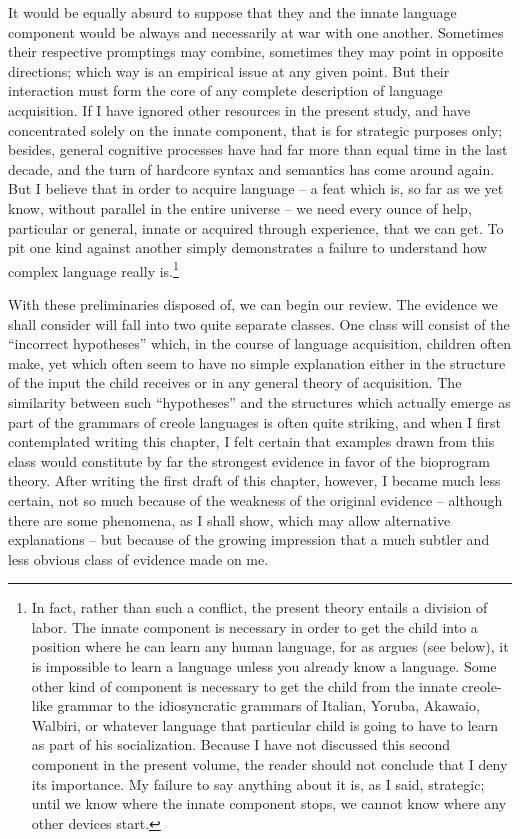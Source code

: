 It would be equally absurd to suppose that they and the innate language component would be always and necessarily at war with one another. Sometimes their respective promptings may combine, sometimes they may point in opposite directions; which way is an empirical issue at any given point. But their interaction must form the core of any complete description of language acquisition. If I have ignored other resources in the present study, and have concentrated solely on the innate component, that is for strategic purposes only; besides, general cognitive processes have had far more than equal time in the last decade, and the turn of hardcore syntax and semantics has come around again. But I believe that in order to acquire language -- a feat which is, so far as we yet know, without parallel in the entire universe -- we need every ounce of help, particular or general, innate or acquired through experience, that we can get. To pit one kind against another simply demonstrates a failure to understand how complex language really is.\footnote{In fact, rather than such a conflict, the present theory entails a division of labor. The innate component is necessary in order to get the child into a position where he can learn any human language, for as \citet{Fodor1975} argues (see below), it is impossible to learn a language unless you already know a language. Some other kind of component is necessary to get the child from the innate creole-like grammar to the idiosyncratic grammars of Italian, Yoruba, Akawaio, Walbiri, or whatever language that particular child is going to have to learn as part of his socialization. Because I have not discussed this second component in the present volume, the reader should not conclude that I deny its importance. My failure to say anything about it is, as I said, strategic; until we know where the innate component stops, we cannot know where any other devices start.}

With these preliminaries disposed of, we can begin our review. The evidence we shall consider will fall into two quite separate classes. One class will consist of the ``incorrect hypotheses'' which, in the course of language acquisition, children often make, yet which often seem to have no simple explanation either in the structure of the input the child receives or in any general theory of acquisition. The similarity between such ``hypotheses'' and the structures which actually emerge as part of the grammars of creole languages is often quite striking, and when I first contemplated writing this chapter, I felt certain that examples drawn from this class would constitute by far the strongest evidence in favor of the bioprogram theory. After writing the first draft of this chapter, however, I became much less certain, not so much because of the weakness of the original evidence -- although there are some phenomena, as I shall show, which may allow alternative explanations -- but because of the growing impression that a much subtler and less obvious class of evidence made on me.


